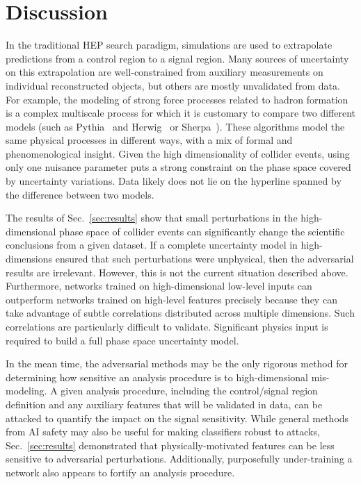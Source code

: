\documentclass[reprint,nofootinbib,...]{revtex4-1}
\begin{document}
\section{Discussion}
\label{sec:discussion}

In the traditional HEP search paradigm, simulations are used to extrapolate predictions from a control region to a signal region.  Many sources of uncertainty on this extrapolation are well-constrained from auxiliary measurements on individual reconstructed objects, but others are mostly unvalidated from data.  For example, the modeling of strong force processes related to hadron formation is a complex multiscale process for which it is customary to compare two different models (such as Pythia~\cite{Sjostrand:2006za,Sjostrand:2007gs} and Herwig~\cite{Bahr:2008pv,Bellm:2015jjp} or Sherpa~\cite{Gleisberg:2008ta,Bothmann:2019yzt}).  These algorithms model the same physical processes in different ways, with a mix of formal and phenomenological insight.   Given the high dimensionality of collider events, using only one nuisance parameter puts a strong constraint on the phase space covered by uncertainty variations.  Data likely does not lie on the hyperline spanned by the difference between two models.

The results of Sec.~\ref{sec:results} show that small perturbations in the high-dimensional phase space of collider events can significantly change the scientific conclusions from a given dataset.  If a complete uncertainty model in high-dimensions ensured that such perturbations were unphysical, then the adversarial results are irrelevant.  However, this is not the current situation described above.  Furthermore, networks trained on high-dimensional low-level inputs can outperform networks trained on high-level features precisely because they can take advantage of subtle correlations distributed across multiple dimensions.  Such correlations are particularly difficult to validate.  Significant physics input is required to build a full phase space uncertainty model. 

In the mean time, the adversarial methods may be the only rigorous method for determining how sensitive an analysis procedure is to high-dimensional mis-modeling.  A given analysis procedure, including the control/signal region definition and any auxiliary features that will be validated in data, can be attacked to quantify the impact on the signal sensitivity.  While general methods from AI safety may also be useful for making classifiers robust to attacks, Sec.~\ref{sec:results} demonstrated that physically-motivated features can be less sensitive to adversarial perturbations.  Additionally, purposefully under-training a network also appears to fortify an analysis procedure.
\end{document}
